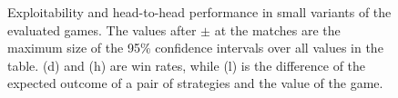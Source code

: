 \begin{figure}[t]
{\begin{minipage}{0.24\textwidth}
\end{minipage}}
\caption{Exploitability and head-to-head performance in small variants of the evaluated games. The values after $\pm$ at the matches are the maximum size of the 95\% confidence intervals over all values in the table. (d) and (h) are win rates, while (l) is the difference of the  expected outcome of a pair of strategies and the value of the game.}\label{fig:small}
\end{figure}


